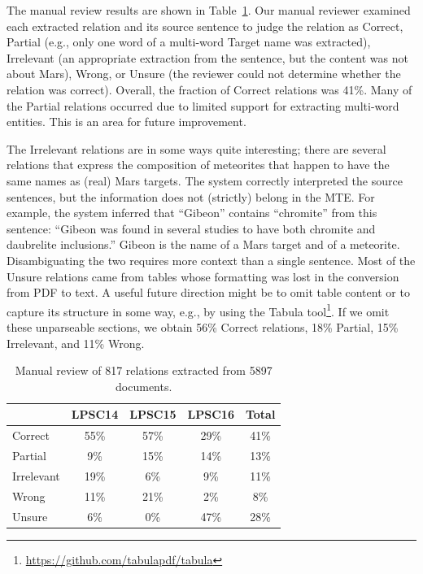 \documentclass[letterpaper]{article} %
\begin{document}
The manual review results are shown in Table~\ref{tab:large}.  Our
manual reviewer examined each extracted relation and its source
sentence to judge the relation as Correct, Partial (e.g., only one
word of a multi-word Target name was extracted), Irrelevant (an
appropriate 
extraction from the sentence, but the content was not about Mars),
Wrong, or Unsure (the reviewer could not determine whether the
relation was correct).
%
Overall, the fraction of Correct relations was 41\%.  Many of the
Partial relations occurred due to limited support for extracting
multi-word entities.  This is an area for future improvement.

The Irrelevant relations are in some ways quite interesting;
there are several relations that express the composition of meteorites
that happen to have the same names as (real) Mars targets.  The system
correctly interpreted the source sentences, but the information does
not (strictly) belong in the MTE. 
For example, the system inferred that ``Gibeon'' contains ``chromite''
from this sentence: 
``Gibeon was found in several studies to have both chromite and
daubrelite inclusions.''
Gibeon is the name of a Mars target and of a meteorite.
Disambiguating the two requires more context than a single sentence.
%
Most of the Unsure relations came from tables whose formatting was
lost in the conversion from PDF to text.  A useful future direction
might be to omit table content or to capture its structure in some
way, e.g., by using the Tabula
tool\footnote{\url{https://github.com/tabulapdf/tabula}}.  If we omit
these unparseable sections, we obtain 56\% Correct 
relations, 18\% Partial, 15\% Irrelevant, and 11\% Wrong.

\begin{table}
\caption{Manual review of 817 relations extracted from 5897 documents.} 
\label{tab:large}
\begin{center}
\begin{tabular}{l|ccc|c}
        & LPSC14 & LPSC15 & LPSC16 & Total \\ \hline
Correct    & 55\% & 57\% & 29\% & 41\% \\ \hline
Partial    &  9\% & 15\% & 14\% & 13\% \\
Irrelevant & 19\% &  6\% &  9\% & 11\% \\
Wrong      & 11\% & 21\% &  2\% &  8\% \\
Unsure     &  6\% &  0\% & 47\% & 28\% \\
\hline
\end{tabular}
\end{center}
\end{table}
\end{document}
